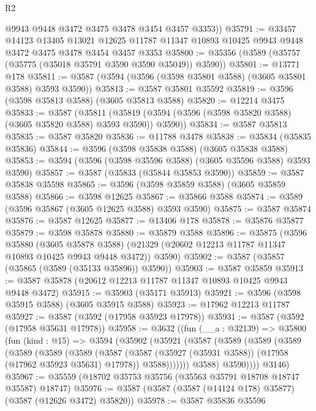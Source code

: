 \begin{lexlean}{R2}
\begin{coremodule}
        @9943
        @9448
        @3472
        @3475
        @3478
        @3454
        @3457
        @3353))
@35791 := @33457
    @14123
    @13405
    @13021
    @12625
    @11787
    @11347
    @10893
    @10425
    @9943
    @9448
    @3472
    @3475
    @3478
    @3454
    @3457
    @3353
@35800 := @35356 (@3589 (@35757 (@35775 (@35018 @35791 @3590 @3590 @35049)) @3590))
@35801 := @13771 @178
@35811 := @3587 (@3594 (@3596 (@3598 @35801 @3588) (@3605 @35801 @3588) @3593 @3590))
@35813 := @3587 @35801 @35592
@35819 := @3596 (@3598 @35813 @3588) (@3605 @35813 @3588)
@35820 := @12214 @3475
@35833 := @3587
    (@35811 (@35819 (@3594 (@3596 (@3598 @35820 @3588) (@3605 @35820 @3588) @3593 @3590)) @3590))
@35834 := @3587 @35813
@35835 := @3587 @35820
@35836 := @11788 @3478
@35838 := @35834 (@35835 @35836)
@35844 := @3596 (@3598 @35838 @3588) (@3605 @35838 @3588)
@35853 := @3594 (@3596 (@3598 @35596 @3588) (@3605 @35596 @3588) @3593 @3590)
@35857 := @3587 (@35833 (@35844 @35853 @3590))
@35859 := @3587 @35838 @35598
@35865 := @3596 (@3598 @35859 @3588) (@3605 @35859 @3588)
@35866 := @3598 @12625
@35867 := @35866 @3588
@35874 := @3589 (@3596 @35867 (@3605 @12625 @3588) @3593 @3590)
@35875 := @3587 @35874
@35876 := @3587 @12625
@35877 := @13406 @178
@35878 := @35876 @35877
@35879 := @3598 @35878
@35880 := @35879 @3588
@35896 := @35875
    (@3596
      @35880
      (@3605 @35878 @3588)
      (@21329 (@20602 @12213 @11787 @11347 @10893 @10425 @9943 @9448 @3472))
      @3590)
@35902 := @3587 (@35857 (@35865 (@3589 (@35133 @35896)) @3590))
@35903 := @3587 @35859
@35913 := @3587 @35878 (@20612 @12213 @11787 @11347 @10893 @10425 @9943 @9448 @3472)
@35915 := @35903 (@35171 @35913)
@35921 := @3596 (@3598 @35915 @3588) (@3605 @35915 @3588)
@35923 := @17962 @12213 @11787
@35927 := @3587 (@3592 (@17958 @35923 @17978))
@35931 := @3587 (@3592 (@17958 @35631 @17978))
@35958 := @3632
    ((fun (__a : @32139) =>
    @35800
      (fun (kind : @15) =>
      @3594
        (@35902
          (@35921
            (@3587
              (@3589
                (@3589
                  (@3589
                    (@3589
                      (@3589
                        (@3589
                          (@3587
                            (@3587 (@35927 (@35931 @3588)) (@17958 (@17962 @35923 @35631) @17978))
                            @3588)))))))
              @3588)
            @3590))))
      @3146)
@35967 := @35559 (@18702 @35753 @35756 (@35563 @35791 @18708 @18747 @35587) @18747)
@35976 := @3587 (@3587 (@3587 (@14124 @178) @35877) (@3587 (@12626 @3472) @35820))
@35978 := @3587 @35836 @35596

\end{coremodule}
\end{lexlean}
